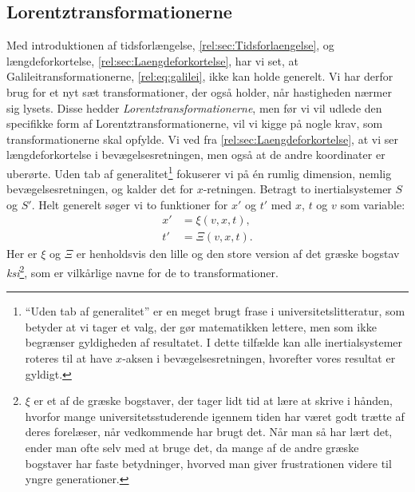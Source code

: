 \subsection{Lorentztransformationerne} \label{rel:sec:krav}
Med introduktionen af tidsforlængelse, \cref{rel:sec:Tidsforlaengelse}, og længdeforkortelse, \cref{rel:sec:Laengdeforkortelse}, har vi set, at Galileitransformationerne, \cref{rel:eq:galilei}, ikke kan holde generelt. Vi har derfor brug for et nyt sæt transformationer, der også holder, når hastigheden nærmer sig lysets. Disse hedder \emph{Lorentztransformationerne}, men før vi vil udlede den specifikke form af Lorentztransformationerne,  vil vi kigge på nogle krav, som transformationerne skal opfylde. Vi ved fra \cref{rel:sec:Laengdeforkortelse}, at vi ser længdeforkortelse i bevægelsesretningen, men også at de andre koordinater er uberørte. Uden tab af generalitet\footnote{``Uden tab af generalitet'' er en meget brugt frase i universitetslitteratur, som betyder at vi tager et valg, der gør matematikken lettere, men som ikke begrænser gyldigheden af resultatet. I dette tilfælde kan alle inertialsystemer roteres til at have $x$-aksen i bevægelsesretningen, hvorefter vores resultat er gyldigt.} fokuserer vi på én rumlig dimension, nemlig bevægelsesretningen, og kalder det for $x$-retningen.
Betragt to inertialsystemer $S$ og $S'$. Helt generelt søger vi to funktioner for $x'$ og $t'$ med $x$, $t$ og $v$ som variable:
%
\begin{subequations}
\begin{align}
    x'&=\xi(v,x,t),\\
    t'&=\Xi(v,x,t).
\end{align}
\end{subequations}
%
Her er $\xi$ og $\Xi$ er henholdsvis den lille og den store version af det græske bogstav \emph{ksi}\footnote{$\xi$ er et af de græske bogstaver, der tager lidt tid at lære at skrive i hånden, hvorfor mange universitetsstuderende igennem tiden har været godt trætte af deres forelæser, når vedkommende har brugt det. Når man så har lært det, ender man ofte selv med at bruge det, da mange af de andre græske bogstaver har faste betydninger, hvorved man giver frustrationen videre til yngre generationer.}, som er vilkårlige navne for de to transformationer.
%
